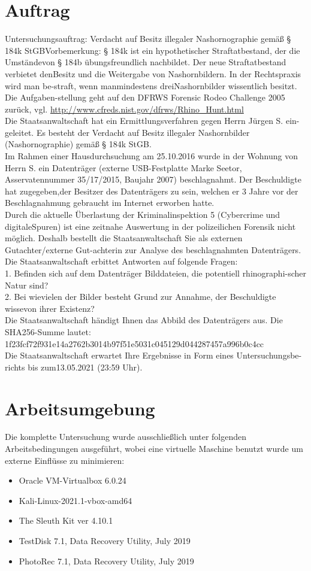 \section{Auftrag}
Untersuchungsauftrag: Verdacht auf Besitz illegaler Nashornographie gemäß § 184k StGBVorbemerkung: § 184k ist ein hypothetischer Straftatbestand, der die Umständevon § 184b übungsfreundlich nachbildet. Der neue Straftatbestand verbietet denBesitz und die Weitergabe von Nashornbildern. In der Rechtspraxis wird man be-straft, wenn manmindestens dreiNashornbilder wissentlich besitzt. Die Aufgaben-stellung geht auf den DFRWS Forensic Rodeo Challenge 2005 zurück, vgl. \url{http://www.cfreds.nist.gov/dfrws/Rhino_Hunt.html}\\
Die Staatsanwaltschaft hat ein Ermittlungsverfahren gegen Herrn Jürgen S. ein-geleitet. Es besteht der Verdacht auf Besitz illegaler Nashornbilder (Nashornographie) gemäß § 184k StGB.\\
Im Rahmen einer Hausdurchsuchung am 25.10.2016 wurde in der Wohnung von Herrn S. ein Datenträger (externe USB-Festplatte Marke Seetor, Asservatennummer 35/17/2015, Baujahr 2007) beschlagnahmt. Der Beschuldigte hat zugegeben,der Besitzer des Datenträgers zu sein, welchen er 3 Jahre vor der Beschlagnahmung gebraucht im Internet erworben hatte.\\
Durch die aktuelle Überlastung der Kriminalinspektion 5 (Cybercrime und digitaleSpuren) ist eine zeitnahe Auswertung in der polizeilichen Forensik nicht möglich. Deshalb bestellt die Staatsanwaltschaft Sie als externen Gutachter/externe Gut-achterin zur Analyse des beschlagnahmten Datenträgers.\\
Die Staatsanwaltschaft erbittet Antworten auf folgende Fragen:\\
1. Befinden sich auf dem Datenträger Bilddateien, die potentiell rhinographi-scher Natur sind?\\
2. Bei wievielen der Bilder besteht Grund zur Annahme, der Beschuldigte wissevon ihrer Existenz?\\
Die Staatsanwaltschaft händigt Ihnen das Abbild des Datenträgers aus. Die SHA256-Summe lautet:\\ 1f23fcf72f931e14a2762b3014b97f51e5031c045129d044287457a996b0c4cc\\
Die Staatsanwaltschaft erwartet Ihre Ergebnisse in Form eines Untersuchungsbe-richts bis zum13.05.2021 (23:59 Uhr).

\section{Arbeitsumgebung}
Die komplette Untersuchung wurde ausschließlich unter folgenden Arbeitsbedingungen ausgeführt, wobei eine virtuelle Maschine benutzt wurde um externe Einflüsse zu minimieren:
\begin{itemize}
	\item Oracle VM-Virtualbox 6.0.24 
	\item Kali-Linux-2021.1-vbox-amd64
	\item The Sleuth Kit ver 4.10.1
	\item TestDisk 7.1, Data Recovery Utility, July 2019
	\item PhotoRec 7.1, Data Recovery Utility, July 2019
\end{itemize}
